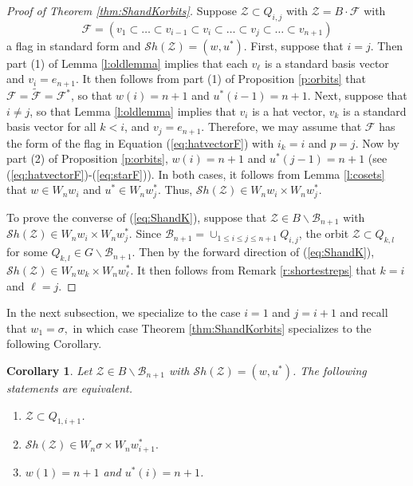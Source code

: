 \documentclass[12pt]{amsart}
\numberwithin{equation}{section}
\newtheorem{cor}[thm]{Corollary}
\newcommand{\cZ}{{\mathcal Z}}
\newcommand{\Wn}{{W}_n}
\newcommand{\B}{\mathcal{B}}
\newcommand{\F}{\mathcal{F}}
\newcommand{\Sh}{\mathcal{S}h}
\begin{document}
\begin{proof}[Proof of Theorem \ref{thm:ShandKorbits}]
Suppose $\cZ\subset Q_{i,j}$ with $\cZ=B\cdot \F$ with 
$$\F=(v_{1}\subset \dots\subset v_{i-1}\subset v_{i}\subset\dots\subset v_{j}\subset \dots\subset v_{n+1})$$
a flag in standard form and $\Sh(\cZ)=(w, u^{*})$.  First, suppose that $i=j$.  
Then part (1) of Lemma \ref{l:oldlemma} implies that each $v_{\ell}$ is a standard basis vector and $v_{i}=e_{n+1}$.   It then follows from part (1) of Proposition \ref{p:orbits} that 
$\F=\tilde{\F}=\F^{*}$, so that $w(i)=n+1$ and $u^{*}(i-1)=n+1$.  Next, suppose that $i\neq j$, so that Lemma \ref{l:oldlemma} implies that $v_{i}$ is a hat vector, $v_{k}$ is a standard basis vector for all $k<i$, and $v_{j}=e_{n+1}$.  Therefore, we may assume that $\F$ has the form of the flag in Equation (\ref{eq:hatvectorF}) with $i_{k}=i$ and $p=j$.  Now by part (2) of Proposition \ref{p:orbits}, $w(i)=n+1$ and $u^{*}(j-1)=n+1$ (see (\ref{eq:hatvectorF})-(\ref{eq:starF})).  In both cases, it follows from Lemma \ref{l:cosets} that $w\in \Wn w_{i}$ and $u^{*}\in \Wn w_{j}^{*}$.  Thus, $\Sh(\cZ)\in \Wn w_{i}\times \Wn w_{j}^{*}$. 

To prove the converse of (\ref{eq:ShandK}), suppose that $\cZ\in B\backslash\B_{n+1}$ with $\Sh(\cZ)\in \Wn w_{i}\times \Wn w_{j}^{*}$.  Since $\B_{n+1}=\cup_{1\leq i\leq j\leq n+1} Q_{i,j}$, the orbit $\cZ\subset Q_{k,l}$ for some $Q_{k,l}\in G\backslash\B_{n+1}$.  Then by the forward direction of (\ref{eq:ShandK}), $\Sh(\cZ)\in \Wn w_{k}\times \Wn w_{\ell}^*.$ 
It then follows from Remark \ref{r:shortestreps} that $k=i$ and $\ell=j$. 
\end{proof}

In the next subsection, we specialize to the case $i=1$ and $j=i+1$ and recall that $w_1=\sigma,$ in which case Theorem \ref{thm:ShandKorbits} specializes to the following Corollary.

\begin{cor}\label{c:specialcase}
Let $\cZ\in B\backslash\B_{n+1}$ with $\Sh(\cZ)=(w,u^{*})$.  The following statements 
are equivalent.
\begin{enumerate}
\item $\cZ\subset Q_{1,i+1}$.
\item $\Sh(\cZ)\in \Wn \sigma\times \Wn w_{i+1}^{*}.$
\item $w(1)=n+1$ and $u^{*}(i)=n+1$.  
\end{enumerate}

\end{cor}
\end{document}
